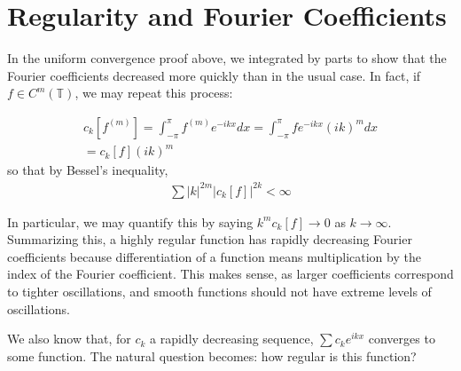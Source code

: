 \documentclass{article}
\newcommand{\bT}{\mathbb{T}}
\begin{document}
	\section{Regularity and Fourier Coefficients}
	
	In the uniform convergence proof above, we integrated by parts to show that the Fourier coefficients decreased more quickly than in the usual case. In fact, if $f \in C^{m}(\bT)$, we may repeat this process:
	
	\begin{align*}
		c_{k}[f^{(m)}] = \int_{-\pi}^{\pi} f^{(m)} e^{-ikx}dx = \int_{-\pi}^{\pi}f e^{-ikx}(ik)^{m} dx \\
		 =c_{k}[f](ik)^{m}
	\end{align*}
	so that by Bessel's inequality, 
	\begin{align*}
		\sum |k|^{2m} |c_{k}[f]|^{2k} < \infty
	\end{align*}
	
	In particular, we may quantify this by saying $k^m c_{k}[f] \to 0$ as $k \to \infty$. Summarizing this, a highly regular function has rapidly decreasing Fourier coefficients because differentiation of a function means multiplication by the index of the Fourier coefficient. This makes sense, as larger coefficients correspond to tighter oscillations, and smooth functions should not have extreme levels of oscillations. 
	
	We also know that, for $c_{k}$ a rapidly decreasing sequence, $\sum c_{k} e^{ikx}$ converges to some function. The natural question becomes: how regular is this function?
	
\end{document}
